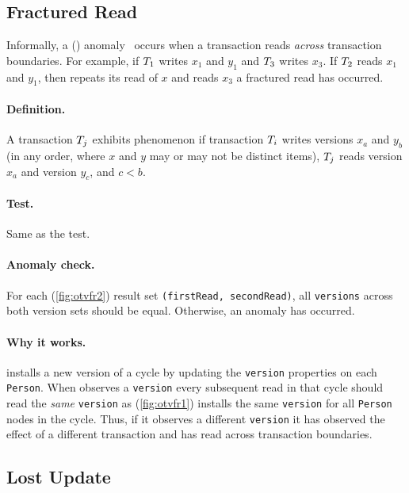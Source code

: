 \subsection{Fractured Read}
\label{sec:fractured-reads}

Informally, a  () anomaly~\cite{DBLP:journals/tods/BailisFGHS16} occurs when a transaction reads \emph{across} transaction boundaries.
For example, if $T_1$ writes $x_1$ and $y_1$ and $T_3$ writes $x_3$.
If $T_2$ reads $x_1$ and $y_1$, then repeats its read of $x$ and reads $x_3$ a fractured read has occurred.

\paragraph{Definition.}
A transaction $T_j$ exhibits phenomenon  if transaction $T_i$ writes versions $x_a$ and $y_b$ (in any order, where $x$ and $y$ may or may not be distinct items), $T_j$ reads version $x_a$ and version $y_c$, and $c < b$.

\paragraph{Test.}
Same as the  test.

\paragraph{Anomaly check.}
For each   (\autoref{fig:otvfr2}) result set \texttt{(firstRead, secondRead)}, all
\texttt{versions} across both version sets should be equal.
Otherwise, an  anomaly has occurred.

\paragraph{Why it works.}
 installs a new version of a cycle by updating the \texttt{version} properties on each \texttt{Person}.
When  observes a \texttt{version} every subsequent read in that cycle should read the \emph{same} \texttt{version} as  (\autoref{fig:otvfr1}) installs the same \texttt{version} for all \texttt{Person} nodes in the cycle.
Thus, if it observes a different \texttt{version} it has observed the effect of a different transaction and has read across transaction boundaries.


\subsection{Lost Update}
\label{sec:lost-update}

